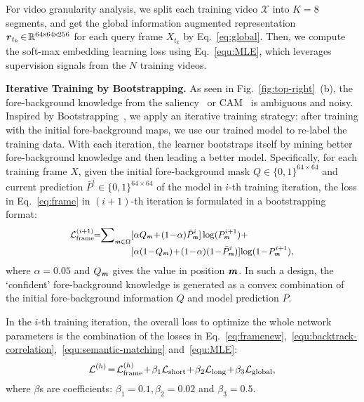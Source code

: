 \documentclass[10pt,twocolumn,letterpaper]{article}
\begin{document}
For video granularity analysis, we split each training video $\mathcal{X}$ into $K\!\!=\!\!8$ segments, and get the global information augmented representation $\textbf{\textit{r}}_{t_k}\!\in\!\mathbb{R}^{64\!\times\!64\!\times\!256}$  for each query frame $X_{t_{k}}$ by Eq.~\!\ref{eq:global}. Then, we compute the soft-max embedding learning loss using Eq.~\!\ref{equ:MLE}, which leverages supervision signals from the $N$ training videos.


\noindent\textbf{Iterative Training by  Bootstrapping.} As seen  in Fig.~\!\ref{fig:top-right}~\!(b), the fore-background knowledge from the saliency~\!\cite{DBLP:conf/cvpr/YangZLRY13} or CAM~\!\cite{zeng2019multi,zhou2016learning} is ambiguous and noisy. Inspired by Bootstrapping~\!\cite{reed2014training}, we apply an iterative training strategy: after training with the initial fore-background maps, we use our trained model to re-label the training data. With each iteration, the learner bootstraps itself by mining better fore-background knowledge and then leading a better model. Specifically, for each training frame $X$, given the initial fore-background mask $Q\!\in\!\{0,1\}^{64\!\times\!64}$ and current prediction $\bar{P}^i\!\in\!\{0,1\}^{64\!\times\!64}$ of the model in $i$-th training iteration, the loss in Eq.~\!\ref{eq:frame} in $(i\!+\!1)$-th iteration is formulated in a bootstrapping format:
\vspace{-2pt}
\begin{equation}\small
\begin{aligned}
\!\!\!\!\mathcal{L}^{(i+1)}_{\text{frame}}\!\!=\!\!\sum\nolimits_{\textbf{\textit{m}}\in\Omega}&[\alpha Q_{\textbf{\textit{m}}}\!+\!(1\!-\!\alpha)\bar{P}_{\textbf{\textit{m}}}^{i}]\log(P_{\textbf{\textit{m}}}^{i+1})+\\[-0.7mm] &[\alpha(1\!-\!Q_{\textbf{\textit{m}}})\!+\!(1\!-\!\alpha)(1\!-\!\bar{P}_{\textbf{\textit{m}}}^{i})]\!\log(1\!-\!P_{\textbf{\textit{m}}}^{i+1}),\!\!\!
\end{aligned}
\vspace{-1pt}
\label{eq:framenew}
\end{equation}
where $\alpha\!=\!0.05$ and $Q_{\textbf{\textit{m}}}$ gives the value in position $\textbf{\textit{m}}$. In such a design, the `confident' fore-background knowledge is generated as a convex combination of the initial fore-background information $Q$ and model prediction $P$.

In the $i$-th training iteration, the overall loss to optimize the whole network parameters is the combination of the losses in Eq.~\!\ref{eq:framenew},~\!\ref{equ:backtrack-correlation},~\!\ref{equ:semantic-matching} and~\!\ref{equ:MLE}:
\vspace{-2pt}
\begin{equation}\small
\mathcal{L}^{(h)}\!=\!\mathcal{L}^{(h)}_{\text{frame}}\!+\!\beta_1\mathcal{L}_{\text{short}}\!+\! \beta_2\mathcal{L}_{\text{long}}\!+\!\beta_3\mathcal{L}_{\text{global}},\label{equ:total}
\vspace{-1pt}
\end{equation}
where $\beta$s are coefficients: $\beta_1\!=\!0.1, \beta_2\!=\!0.02$ and $\beta_3\!=\!0.5$. 
\end{document}
